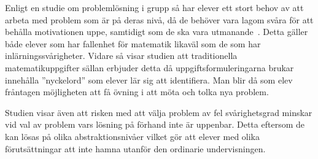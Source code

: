 \textcolor{Mahogany}{Enligt en studie om problemlösning i grupp så har elever ett stort behov av att arbeta med problem som är på deras nivå, då de behöver vara lagom svåra för att behålla motivationen uppe, samtidigt som de ska vara utmanande~\cite{undervisningviaproblemlosning}. Detta gäller både elever som har fallenhet för matematik likaväl som de som har inlärningssvårigheter. Vidare så visar studien att traditionella matematikuppgifter sällan erbjuder detta då uppgiftsformuleringarna brukar innehålla ''nyckelord'' som elever lär sig att identifiera. Man blir då som elev fråntagen möjligheten att få övning i att möta och tolka nya problem.}

\textcolor{Mahogany}{Studien visar även att risken med att välja problem av fel svårighetsgrad minskar vid val av problem vars lösning på förhand inte är uppenbar. Detta eftersom de kan lösas på olika abstraktionsnivåer vilket gör att elever med olika förutsättningar att inte hamna utanför den ordinarie undervisningen.}

